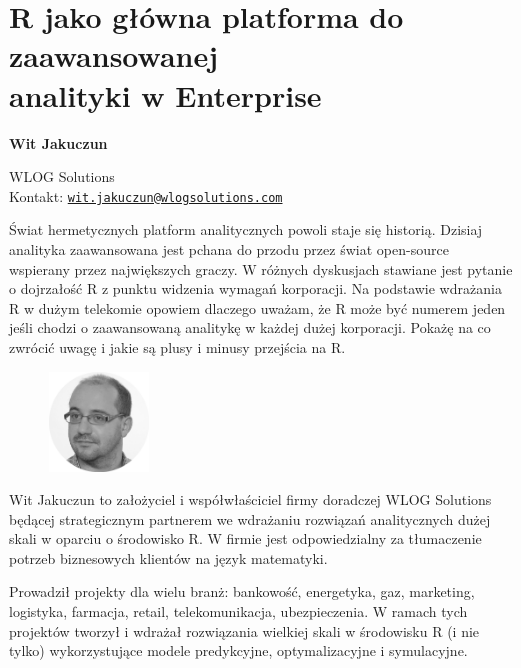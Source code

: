 \documentclass[\main/boa.tex]{subfiles}
\begin{document}
\section[R jako główna platforma do zaawansowanej analityki w Enterprise]{R jako główna platforma do zaawansowanej\\ analityki w Enterprise}


\begin{minipage}{0.915\textwidth}
	\centering
  {\bf \LARGE {} Wit Jakuczun}
\end{minipage}



\begin{affiliations}
\begin{minipage}{0.915\textwidth}
\centering
\large WLOG Solutions \\[1pt]
Kontakt: \href{mailto:wit.jakuczun@wlogsolutions.com}{\nolinkurl{wit.jakuczun@wlogsolutions.com}}\\
\end{minipage}
\end{affiliations}


Świat hermetycznych platform analitycznych powoli staje się historią. Dzisiaj analityka zaawansowana jest pchana do przodu przez świat open-source wspierany przez największych graczy. W różnych dyskusjach stawiane jest pytanie o dojrzałość R z punktu widzenia wymagań korporacji. Na podstawie wdrażania R w dużym telekomie opowiem dlaczego uważam, że R może być numerem jeden jeśli chodzi o zaawansowaną analitykę w każdej dużej korporacji. Pokażę na co zwrócić uwagę i jakie są plusy i minusy przejścia na R. 

\bio
\begin{figure}
    \includegraphics[width=100px]{img/guests/czarno_biale/wjakuczun.png}
\end{figure} 
Wit Jakuczun to założyciel i współwłaściciel firmy doradczej WLOG Solutions będącej strategicznym partnerem we wdrażaniu rozwiązań analitycznych dużej skali w oparciu o środowisko R. W firmie jest odpowiedzialny za tłumaczenie potrzeb biznesowych klientów na język matematyki.

Prowadził projekty dla wielu branż: bankowość, energetyka, gaz, marketing, logistyka, farmacja, retail, telekomunikacja, ubezpieczenia. W ramach tych projektów tworzył i wdrażał rozwiązania wielkiej skali w środowisku R (i nie tylko) wykorzystujące modele predykcyjne, optymalizacyjne i symulacyjne.
\end{document}
